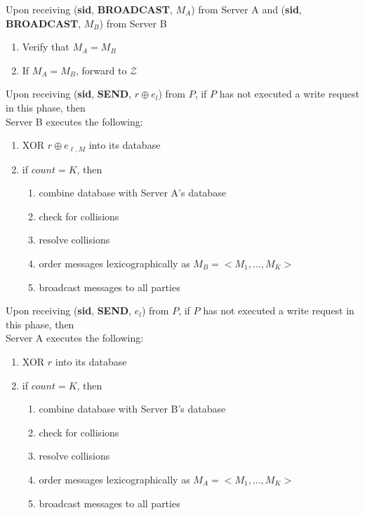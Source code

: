 \begin{tcolorbox}[colback=white, arc=5pt]
\extitem Upon receiving (\textbf{sid}, \textbf{BROADCAST}, $M_A$) from Server A and (\textbf{sid}, \textbf{BROADCAST}, $M_B$) from Server B
\begin{enumerate}
    \item Verify that $M_A = M_B$
    \item If $M_A = M_B$, forward to $\mathcal{Z}$
\end{enumerate}

\extitem Upon receiving (\textbf{sid}, \textbf{SEND}, $r\oplus e_l$) from $P$, if $P$ has not executed a write request in this phase, then \\
    Server B executes the following:
    
    \begin{enumerate}
        \item XOR $r\oplus e_{\ell,M}$ into its database  
        \item if $count=K$, then
        \begin{enumerate}
            \item combine database with Server A's database
            \item check for collisions
            \item resolve collisions
            \item order messages lexicographically as $M_B=<M_1,...,M_K>$
            \item broadcast messages to all parties
        \end{enumerate}
    \end{enumerate}

\extitem Upon receiving (\textbf{sid}, \textbf{SEND}, $e_l$) from $P$, if $P$ has not executed a write request in this phase, then \\
    Server A executes the following:
    \begin{enumerate}
        \item XOR $r$ into its database
        \item if $count=K$, then
        \begin{enumerate}
            \item combine database with Server B's database
            \item check for collisions
            \item resolve collisions
            \item order messages lexicographically as $M_A=<M_1,...,M_K>$
            \item broadcast messages to all parties
        \end{enumerate}
    \end{enumerate}
\end{tcolorbox}

\label{fig:riposte_protocol}